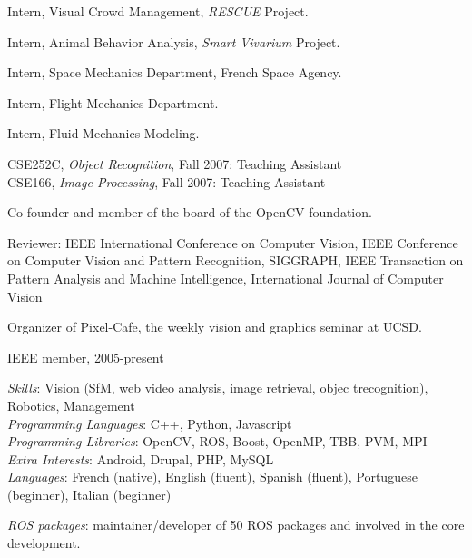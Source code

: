 \begin{llist}
Intern, Visual Crowd Management, {\em RESCUE} Project.

Intern, Animal Behavior Analysis, {\em Smart Vivarium} Project.

Intern, Space Mechanics Department, French Space Agency.

 
Intern, Flight Mechanics Department.

 
Intern, Fluid Mechanics Modeling.

CSE252C, {\em Object Recognition}, Fall 2007: Teaching Assistant\\
CSE166, {\em Image Processing}, Fall 2007: Teaching Assistant


Co-founder and member of the board of the OpenCV foundation.

Reviewer: IEEE International Conference on Computer Vision, IEEE Conference on Computer Vision and Pattern Recognition, 
SIGGRAPH, IEEE Transaction on Pattern Analysis and Machine Intelligence, International Journal of Computer Vision

Organizer of Pixel-Cafe, the weekly vision and graphics seminar at UCSD.

IEEE member, 2005-present

{\em Skills}: Vision (SfM, web video analysis, image retrieval, objec trecognition), Robotics, Management \\
{\em Programming Languages}: C++, Python, Javascript \\
{\em Programming Libraries}: OpenCV, ROS, Boost, OpenMP, TBB, PVM, MPI \\
{\em Extra Interests}: Android, Drupal, PHP, MySQL \\
{\em Languages}: French (native), English (fluent), Spanish (fluent), Portuguese (beginner), Italian (beginner)

{\em ROS packages}: maintainer/developer of 50 ROS packages and involved in the core development.


\end{llist}
